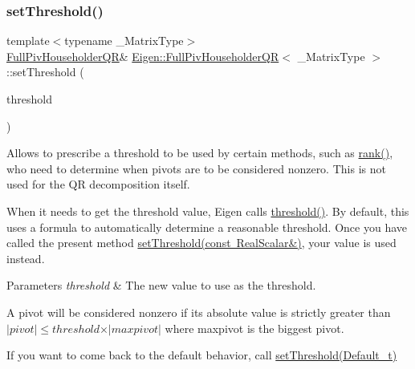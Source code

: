 \subsubsection{\texorpdfstring{setThreshold()}{setThreshold()}\hspace{0.1cm}{\footnotesize\ttfamily [1/2]}}
{\footnotesize\ttfamily template$<$typename \+\_\+\+Matrix\+Type$>$ \\
\mbox{\hyperlink{class_eigen_1_1_full_piv_householder_q_r}{Full\+Piv\+Householder\+QR}}\& \mbox{\hyperlink{class_eigen_1_1_full_piv_householder_q_r}{Eigen\+::\+Full\+Piv\+Householder\+QR}}$<$ \+\_\+\+Matrix\+Type $>$\+::set\+Threshold (\begin{DoxyParamCaption}\item[{const Real\+Scalar \&}]{threshold }\end{DoxyParamCaption})\hspace{0.3cm}{\ttfamily [inline]}}

Allows to prescribe a threshold to be used by certain methods, such as \mbox{\hyperlink{class_eigen_1_1_full_piv_householder_q_r_aeae555220f46477818ccc94aca2de770}{rank()}}, who need to determine when pivots are to be considered nonzero. This is not used for the QR decomposition itself.

When it needs to get the threshold value, Eigen calls \mbox{\hyperlink{class_eigen_1_1_full_piv_householder_q_r_af7f6ac15ca19c2b9e45dc3eaae58c201}{threshold()}}. By default, this uses a formula to automatically determine a reasonable threshold. Once you have called the present method \mbox{\hyperlink{class_eigen_1_1_full_piv_householder_q_r_a92277e572bf98245891015d12dd2b602}{set\+Threshold(const Real\+Scalar\&)}}, your value is used instead.


\begin{DoxyParams}{Parameters}
{\em threshold} & The new value to use as the threshold.\\
\hline
\end{DoxyParams}
A pivot will be considered nonzero if its absolute value is strictly greater than $ \vert pivot \vert \leqslant threshold \times \vert maxpivot \vert $ where maxpivot is the biggest pivot.

If you want to come back to the default behavior, call \mbox{\hyperlink{class_eigen_1_1_full_piv_householder_q_r_aaea4bf3dd145e0cddb16e364cca9d887}{set\+Threshold(\+Default\+\_\+t)}} \mbox{\label{class_eigen_1_1_full_piv_householder_q_r_aaea4bf3dd145e0cddb16e364cca9d887}} 
